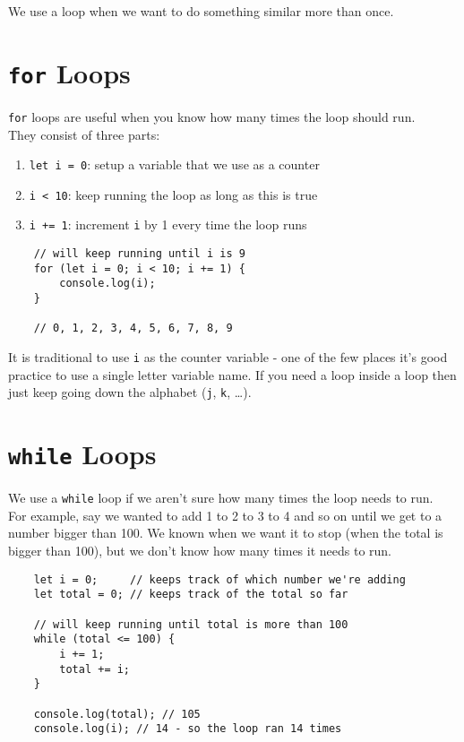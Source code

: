 We use a loop when we want to do something similar more than once.

\section{\texttt{for} Loops}

\texttt{for} loops are useful when you know how many times the loop should run.
\\

They consist of three parts:

\begin{enumerate}
    \item \texttt{let i = 0}: setup a variable that we use as a counter
    \item \texttt{i < 10}: keep running the loop as long as this is true
    \item \texttt{i += 1}: increment \texttt{i} by 1 every time the loop runs
\end{enumerate}

\begin{verbatim}
    // will keep running until i is 9
    for (let i = 0; i < 10; i += 1) {
        console.log(i);
    }

    // 0, 1, 2, 3, 4, 5, 6, 7, 8, 9
\end{verbatim}

It is traditional to use \texttt{i} as the counter variable - one of the few places it's good practice to use a single letter variable name. If you need a loop inside a loop then just keep going down the alphabet (\texttt{j}, \texttt{k}, \ldots).


\pagebreak

\section{\texttt{while} Loops}

We use a \texttt{while} loop if we aren't sure how many times the loop needs to run.
\\

For example, say we wanted to add 1 to 2 to 3 to 4 and so on until we get to a number bigger than 100. We known when we want it to stop (when the total is bigger than 100), but we don't know how many times it needs to run.

\begin{verbatim}
    let i = 0;     // keeps track of which number we're adding
    let total = 0; // keeps track of the total so far

    // will keep running until total is more than 100
    while (total <= 100) {
        i += 1;
        total += i;
    }

    console.log(total); // 105
    console.log(i); // 14 - so the loop ran 14 times
\end{verbatim}



